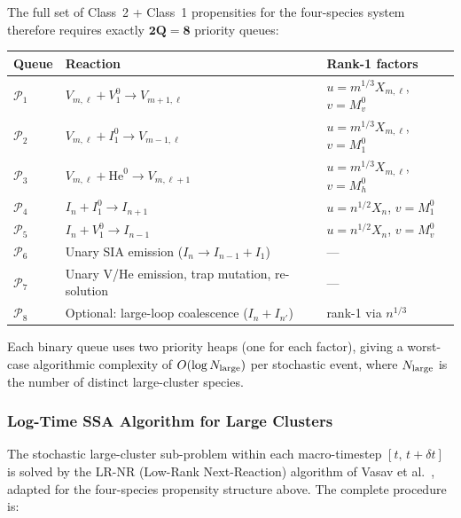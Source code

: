\documentclass[pdflatex,sn-basic]{sn-jnl} %
\begin{document}
The full set of Class~2 + Class~1 propensities for the
four-species system therefore requires exactly $\mathbf{2Q = 8}$
priority queues:
\begin{table}[h]
\centering\label{eq:queue_classes}
\renewcommand{\arraystretch}{1.2}
\begin{tabular}{@{}lll@{}}
\toprule
\textbf{Queue} & \textbf{Reaction} & \textbf{Rank-1 factors} \\
\midrule
$\mathcal{P}_1$ & $V_{m,\ell} + V_1^0 \to V_{m+1,\ell}$ &
  $u = m^{1/3}X_{m,\ell}$,\; $v = M_v^0$ \\
$\mathcal{P}_2$ & $V_{m,\ell} + I_1^0 \to V_{m-1,\ell}$ &
  $u = m^{1/3}X_{m,\ell}$,\; $v = M_1^0$ \\
$\mathcal{P}_3$ & $V_{m,\ell} + \mathrm{He}^0 \to V_{m,\ell+1}$ &
  $u = m^{1/3}X_{m,\ell}$,\; $v = M_h^0$ \\
$\mathcal{P}_4$ & $I_n + I_1^0 \to I_{n+1}$ &
  $u = n^{1/2}X_n$,\; $v = M_1^0$ \\
$\mathcal{P}_5$ & $I_n + V_1^0 \to I_{n-1}$ &
  $u = n^{1/2}X_n$,\; $v = M_v^0$ \\
$\mathcal{P}_6$ & Unary SIA emission ($I_n \to I_{n-1}+I_1$) & --- \\
$\mathcal{P}_7$ & Unary V/He emission, trap mutation, re-solution & --- \\
$\mathcal{P}_8$ & Optional: large-loop coalescence ($I_n+I_{n'}$) &
  rank-1 via $n^{1/3}$ \\
\bottomrule
\end{tabular}
\end{table}
Each binary queue uses two priority heaps (one for each factor),
giving a worst-case algorithmic complexity of
$O(\log N_{\rm large})$ per stochastic event, where $N_{\rm large}$
is the number of distinct large-cluster species.

\subsubsection{Log-Time SSA Algorithm for Large Clusters}
\label{sec:hybrid_logSSA}

The stochastic large-cluster sub-problem within each macro-timestep
$[t,\,t+\delta t]$ is solved by the LR-NR (Low-Rank Next-Reaction)
algorithm of Vasav et al.~\cite{Vasav2026}, adapted for the
four-species propensity structure above.  The complete procedure
is:
\end{document}
